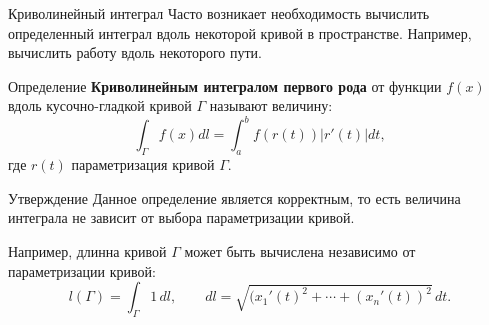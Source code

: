 \documentclass[8pt]{beamer}
\begin{document}
\begin{frame}{Криволинейный интеграл}
Часто возникает необходимость вычислить определенный интеграл вдоль некоторой кривой в пространстве. Например, вычислить работу вдоль некоторого пути.
\begin{block}{Определение}
{\bf Криволинейным интегралом первого рода} от функции $f(x)$ вдоль кусочно-гладкой кривой $\Gamma$ называют величину:
$$\int_\Gamma f(x)dl = \int_a^b f(r(t))|r'(t)|dt,$$
где $r(t)$ параметризация кривой $\Gamma$.
\end{block}
\begin{block}{Утверждение}
Данное определение является корректным, то есть величина интеграла не зависит от выбора параметризации кривой.
\end{block}
Например, длинна кривой $\Gamma$ может быть вычислена независимо от параметризации кривой:
 $$l(\Gamma) = \int_\Gamma 1\,dl,\qquad dl=\sqrt{(x_1'(t)^2+\cdots + (x_n'(t))^2}\,dt.$$
\end{frame}
\end{document}
